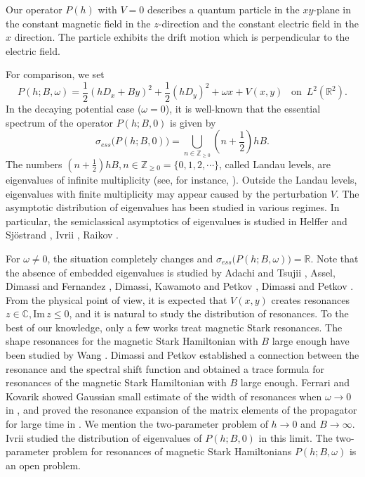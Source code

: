 \documentclass{article}
\theoremstyle{plain}
\theoremstyle{definition}
\theoremstyle{remark}
\newcommand{\RR}{\mathbb{R}}
\newcommand{\CC}{\mathbb{C}}
\newcommand{\ZZ}{\mathbb{Z}}
\newcommand{\IM}{\mathrm{Im}\,}
\begin{document}
Our operator $P(h)$ with $V=0$ describes a quantum particle in the $xy$-plane 
in the constant magnetic field in the $z$-direction and 
the constant electric field in the $x$ direction. 
The particle exhibits the drift motion which is perpendicular to the electric field. 

For comparison, we set 
\[
P(h;B,\omega)=\frac12(hD_x+By)^2+\frac12(hD_y)^2+\omega x+V(x, y)\,\,\,\,\, \mathrm{on}\,\,\,L^2(\RR^2). 
\]
In the decaying potential case ($\omega=0$), it is well-known that the essential  spectrum of the operator $P(h;B,0)$ is given by
$$
\sigma_{ess}\bigl(P(h;B,0)\bigr)=\bigcup_{n\in\ZZ_{\ge 0}}(n+\frac12)hB.
$$ 
The numbers $(n+\frac12)hB, n\in\ZZ_{\ge 0}=\{0,1,2,\cdots\}$, 
called Landau levels, are eigenvalues of infinite multiplicity (see, for instance, \cite{AHS}). 
Outside the Landau levels, eigenvalues with finite multiplicity may appear caused by the perturbation $V$.
The asymptotic distribution of eigenvalues has been studied in various regimes.  
In particular, the semiclassical asymptotics of eigenvalues is studied in 
Helffer and Sj\"{o}strand \cite{HeSjo2}, Ivrii \cite{Iv}, Raikov \cite{Rai}.   

For $\omega\not=0$, the situation completely changes and $\sigma_{ess}\bigl(P(h;B,\omega)\bigr)=\RR$. 
Note that the absence of embedded eigenvalues is studied by
Adachi and Tsujii \cite{AT}, Assel, Dimassi and Fernandez \cite{ADF},  
Dimassi, Kawamoto and Petkov \cite{DKP}, Dimassi and Petkov \cite{DP2}. 
From the physical point of view, it is expected that $V(x,y)$ creates resonances $z\in\CC, \IM z\leq 0$, 
and it is natural to study the distribution of resonances.
To the best of our knowledge, only a few works treat magnetic Stark resonances.
The shape resonances for the magnetic Stark Hamiltonian with $B$ large enough 
have been studied by Wang \cite{Wa1}.
Dimassi and Petkov \cite{DP1} established 
a connection between the resonance and the spectral shift function and 
obtained a trace formula for resonances of the magnetic Stark Hamiltonian with $B$ large enough. 
Ferrari and Kovarik showed Gaussian small estimate of the width of resonances when $\omega\to 0$
in \cite{Fe-Ko0}, 
and proved the resonance expansion of the matrix elements of the propagator for large time in \cite{Fe-Ko}. 
We mention the two-parameter problem of $h\to 0$ and $B\to \infty$. 
Ivrii \cite{Iv} studied the distribution of eigenvalues of $P(h; B, 0)$ in this limit. 
The two-parameter problem for resonances of magnetic Stark Hamiltonians $P(h; B, \omega)$ 
is an open problem.   
\end{document}

